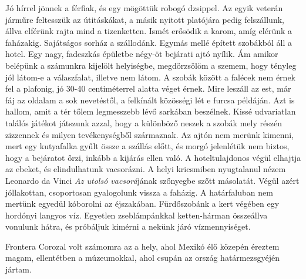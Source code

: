 Jó hírrel jönnek a férfiak, és egy mögöttük robogó dzsippel. Az
egyik veterán járműre feltesszük az útitáskákat, a másik nyitott platójára
pedig felszállunk, állva elférünk rajta mind a tizenketten. Ismét
erősödik a karom, amíg elérünk a faházakig. Sajátságos sorház a szállodánk.
Egymás mellé épített szobákból áll a hotel. Egy nagy, fadeszkás
épületbe négy-öt bejárati ajtó nyílik. Ám amikor belépünk a számunkra
kijelölt helyiségbe, megdörzsölöm a szemem, hogy tényleg jól
látom-e a válaszfalat, illetve nem látom. A szobák között a falécek nem
érnek fel a plafonig, jó 30-40 centiméterrel alatta véget érnek. Mire
leszáll az est, már fáj az oldalam a sok nevetéstől, a felkínált közösségi
lét e furcsa példáján. Azt is hallom, amit a tér tőlem legmesszebb lévő
sarkában beszélnek. Kissé udvariatlan találós játékot játszunk azzal,
hogy a különböző neszek a szobák mely részén zizzennek és milyen
tevékenységből származnak. Az ajtón nem merünk kimenni, mert egy
kutyafalka gyűlt össze a szállás előtt, és morgó jelenlétük nem biztos,
hogy a bejáratot őrzi, inkább a kijárás ellen való. A hoteltulajdonos
végül elhajtja az ebeket, és elindulhatunk vacsorázni. A helyi kricsmiben
nyugtalanul nézem Leonardo da Vinci \textit{Az utolsó vacsorá}jának
szőnyegbe szőtt másolatát. Végül azért jóllakottan, csoportosan gyalogolunk
vissza a faházig. A határfaluban nem mertünk egyedül kóborolni
az éjszakában. Fürdőszobánk a kert végében egy hordónyi langyos víz.
Egyetlen zseblámpánkkal ketten-hárman összeállva vonulunk hátra,
és próbáljuk kimérni a nekünk járó vízmennyiséget.

Frontera Corozal volt számomra az a hely, ahol Mexikó élő közepén
éreztem magam, ellentétben a múzeumokkal, ahol csupán az ország
határmezsgyéjén jártam.

